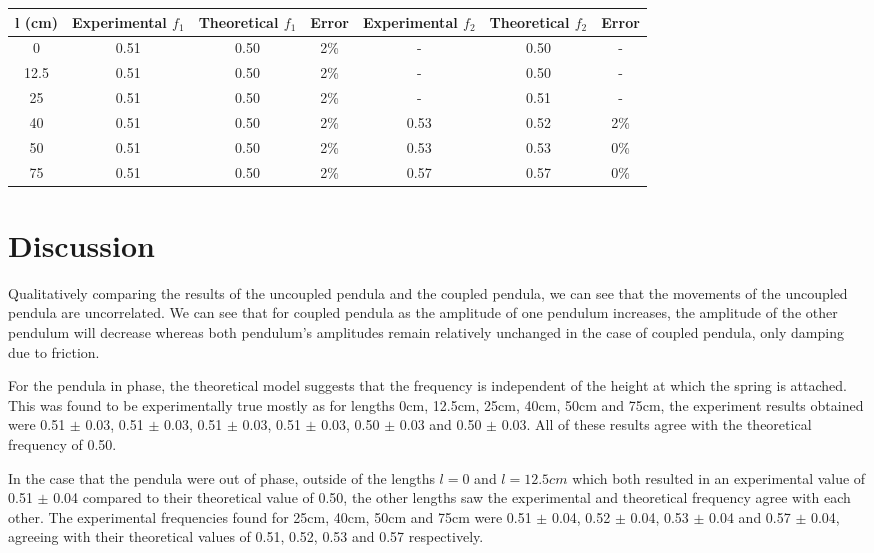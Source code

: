 \documentclass{article}
\begin{document}
\begin{table} [H]
    \centering
    \begin{tabular} {c|c|c|c|c|c|c}
        l (cm) & Experimental $f_1$ & Theoretical $f_1$ & Error & Experimental $f_2$ & 
        Theoretical $f_2$ & Error \\
        \hline
        0 & 0.51 & 0.50 & 2\% & - & 0.50 & -\\
        \hline 
        12.5 & 0.51 & 0.50 & 2\% & - & 0.50 & -\\
        \hline
        25 & 0.51 & 0.50 & 2\% & - & 0.51 & -\\
        \hline
        40 & 0.51 & 0.50 & 2\% & 0.53 & 0.52 & 2\%\\
        \hline
        50 & 0.51 & 0.50 & 2\% & 0.53 & 0.53 & 0\% \\
        \hline
        75 & 0.51 & 0.50 & 2\% & 0.57 & 0.57 & 0\%
    \end{tabular}
\end{table}

\section{Discussion}
Qualitatively comparing the results of the uncoupled pendula
and the coupled pendula, we can see that the movements of the 
uncoupled pendula are uncorrelated. We can see that for coupled 
pendula as the amplitude of one pendulum increases, the amplitude
of the other pendulum will decrease whereas both pendulum's 
amplitudes remain relatively unchanged in the case of coupled pendula, 
only damping due to friction.

For the pendula in phase, the theoretical model suggests that the
frequency is independent of the height at which the spring is attached.
This was found to be experimentally true mostly as for lengths 0cm, 
12.5cm, 25cm, 40cm, 50cm and 75cm, the experiment results obtained were
0.51 $\pm$ 0.03, 0.51 $\pm$ 0.03, 0.51 $\pm$ 0.03, 0.51 $\pm$ 0.03,
0.50 $\pm$ 0.03 and 0.50 $\pm$ 0.03. All of these results agree with 
the theoretical frequency of 0.50.

In the case that the pendula were out of phase, outside of the lengths
$l=0$ and $l=12.5cm$ which both resulted in an experimental value of 
0.51 $\pm$ 0.04 compared to their theoretical value of 0.50, the other 
lengths saw the experimental and theoretical frequency agree with each 
other. The experimental frequencies found for 25cm, 40cm, 50cm and 75cm 
were 0.51 $\pm$ 0.04, 0.52 $\pm$ 0.04, 0.53 $\pm$ 0.04 and 0.57 $\pm$
0.04, agreeing with their theoretical values of 0.51, 0.52, 0.53 and 
0.57 respectively.
\end{document}
